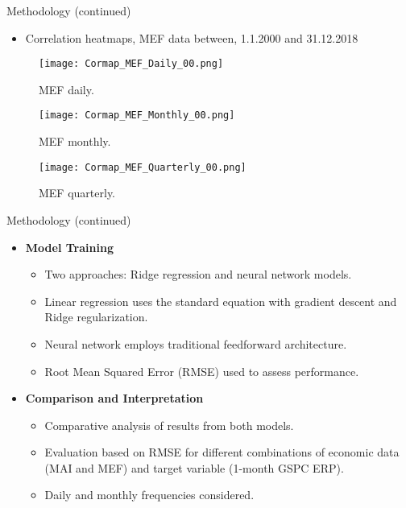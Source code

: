 \documentclass{beamer}
\begin{document}
\begin{frame}{Methodology (continued)}
  \begin{itemize}
    \item{ Correlation heatmaps, MEF data between, 1.1.2000 and 31.12.2018}
  \end{itemize}
  \begin{figure}[H]
    \centering
    \begin{minipage}{0.32\textwidth}
      \centering
      \texttt{[image: Cormap\_MEF\_Daily\_00.png]}
      \caption{MEF daily.}
      \label{fig:linear_prediction}
    \end{minipage}\hfill
    \begin{minipage}{0.32\textwidth}
      \centering
      \texttt{[image: Cormap\_MEF\_Monthly\_00.png]}
      \caption{MEF monthly.}
      \label{fig:nn_prediction}
    \end{minipage}\hfill
    \begin{minipage}{0.32\textwidth}
      \centering
      \texttt{[image: Cormap\_MEF\_Quarterly\_00.png]} 
      \caption{MEF quarterly.}
      \label{fig:third_prediction}
    \end{minipage}
  \end{figure}
\end{frame}

\begin{frame}{Methodology (continued)}
  \begin{itemize}
    \item \textbf{Model Training}
      \begin{itemize}
        \item Two approaches: Ridge regression and neural network models.
        \item Linear regression uses the standard equation with gradient descent and Ridge regularization.
        \item Neural network employs traditional feedforward architecture.
        \item Root Mean Squared Error (RMSE) used to assess performance.
      \end{itemize}
    \item \textbf{Comparison and Interpretation}
      \begin{itemize}
        \item Comparative analysis of results from both models.
        \item Evaluation based on RMSE for different combinations of economic data (MAI and MEF) and target variable (1-month GSPC ERP).
        \item Daily and monthly frequencies considered.
      \end{itemize}
  \end{itemize}
\end{frame}
\end{document}
